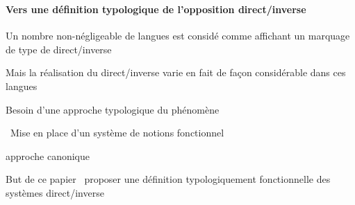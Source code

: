 \begin{frame}
\frametitle{}
\framesubtitle{Vers une définition typologique de l'opposition direct/inverse}
\begin{wideitemize}
\item Un nombre non-négligeable de langues est considé comme affichant un marquage de
  type de direct/inverse
\item Mais la réalisation du direct/inverse varie en fait de façon
  considérable dans ces langues\\ 
\item[\highlightii{\lefthand}] Besoin d'une approche typologique du phénomène
\end{wideitemize}
\begin{wideitemize}
\item[\highlightii{\lefthand}]~Mise en place d'un système de notions fonctionnel
\item[\highlightii{\lefthand}] approche canonique
\end{wideitemize}
\begin{wideitemize}
\item[\highlighti{\lefthand}] But de ce papier \lefthand ~proposer une définition typologiquement
  fonctionnelle des systèmes direct/inverse
\end{wideitemize}
\end{frame}